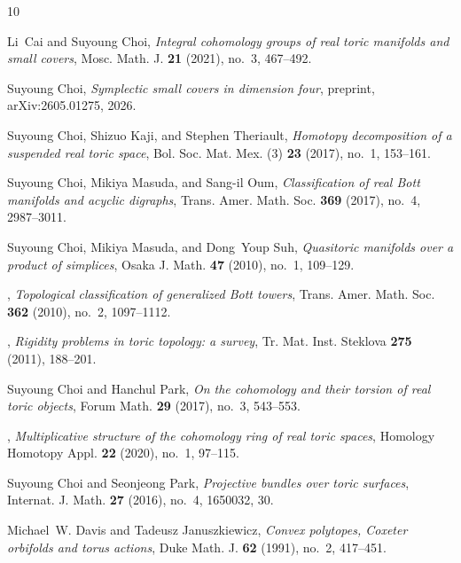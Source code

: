 \documentclass{amsart}
\numberwithin{equation}{section}
\theoremstyle{definition}
\theoremstyle{remark}
\begin{document}
\begin{thebibliography}{10}

Li~Cai and Suyoung Choi, \emph{Integral cohomology groups of real toric
  manifolds and small covers}, Mosc. Math. J. \textbf{21} (2021), no.~3,
  467--492. 

Suyoung Choi, \emph{Symplectic small covers in dimension four}, preprint,
  arXiv:2605.01275, 2026.

Suyoung Choi, Shizuo Kaji, and Stephen Theriault, \emph{Homotopy decomposition
  of a suspended real toric space}, Bol. Soc. Mat. Mex. (3) \textbf{23} (2017),
  no.~1, 153--161. 

Suyoung Choi, Mikiya Masuda, and Sang-il Oum, \emph{Classification of real
  {B}ott manifolds and acyclic digraphs}, Trans. Amer. Math. Soc. \textbf{369}
  (2017), no.~4, 2987--3011. 

Suyoung Choi, Mikiya Masuda, and Dong~Youp Suh, \emph{Quasitoric manifolds over
  a product of simplices}, Osaka J. Math. \textbf{47} (2010), no.~1, 109--129.

\bysame, \emph{Topological classification of generalized {B}ott towers}, Trans.
  Amer. Math. Soc. \textbf{362} (2010), no.~2, 1097--1112. 

\bysame, \emph{Rigidity problems in toric topology: a survey}, Tr. Mat. Inst.
  Steklova \textbf{275} (2011), 188--201. 

Suyoung Choi and Hanchul Park, \emph{On the cohomology and their torsion of
  real toric objects}, Forum Math. \textbf{29} (2017), no.~3, 543--553.

\bysame, \emph{Multiplicative structure of the cohomology ring of real toric
  spaces}, Homology Homotopy Appl. \textbf{22} (2020), no.~1, 97--115.

Suyoung Choi and Seonjeong Park, \emph{Projective bundles over toric surfaces},
  Internat. J. Math. \textbf{27} (2016), no.~4, 1650032, 30. 

Michael~W. Davis and Tadeusz Januszkiewicz, \emph{Convex polytopes, {C}oxeter
  orbifolds and torus actions}, Duke Math. J. \textbf{62} (1991), no.~2,
  417--451. 


\end{thebibliography}
\end{document}
